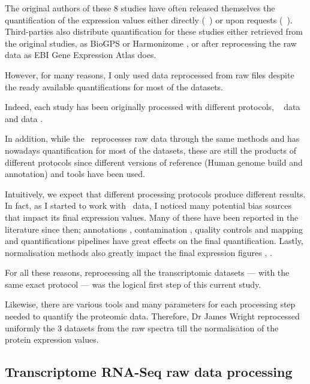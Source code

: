 The original authors of these 8 studies have often released themselves the
quantification of the expression values either directly (\eg\ \cite{Krupp2012})
or upon requests (\eg\ \cite{PandeyData}).  Third-parties also distribute
quantification for these studies either retrieved from the original studies,
as BioGPS \citep{BioGPS1} or Harmonizome \citep{Harmonizome},
or after reprocessing the raw data as EBI Gene Expression Atlas
\citep{EBIgxa} does.

However, for many reasons, I only used data reprocessed from raw files despite
the ready available quantifications for most of the datasets.

Indeed, each study has
been originally processed with different protocols, \eg\ \dataset{\Gtex}
data \citep{GTExTranscript} and  data \citep{Krupp2012}.

In addition, while the \egxa\ reprocesses raw data through the same methods
and has nowadays quantification for most of the datasets, these are still the
products of different protocols since
different versions of reference (Human genome build and annotation) and tools
have been used.

Intuitively, we expect that different processing protocols produce
different results. In fact, as I started to work with \Rnaseq\ data,
I noticed many potential bias
sources that impact its final expression values. Many of these have been
reported in the literature since then;
annotations \citep{annotationDiff},
contamination \citep{contaminationRNAseq},
quality controls \citep{qualityRNAseq} and
mapping and quantifications pipelines \citep{Fonseca2014}
have great effects on the final quantification. Lastly, normalisation
methods also greatly impact the final expression figures
\citep{Dillies2013}, \citep{normalisation2}.

For all these reasons, reprocessing all the transcriptomic datasets --- with the
same exact protocol --- was the logical first step of this current study.

Likewise, there are various tools and many parameters for each processing step
needed to quantify the proteomic data. Therefore, Dr James Wright reprocessed
uniformly the 3 datasets from the raw spectra till the normalisation of the
protein expression values.

\subsection{Transcriptome RNA-Seq raw data processing}


